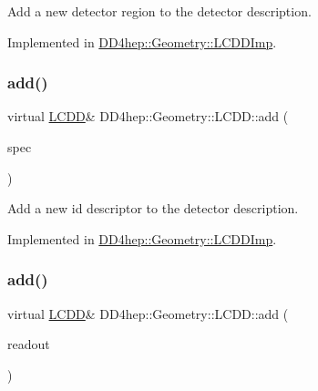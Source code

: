 Add a new detector region to the detector description. 



Implemented in \hyperlink{class_d_d4hep_1_1_geometry_1_1_l_c_d_d_imp_ab8c4f8e119f235e5f050349b19892d47}{D\+D4hep\+::\+Geometry\+::\+L\+C\+D\+D\+Imp}.

\hypertarget{class_d_d4hep_1_1_geometry_1_1_l_c_d_d_a346e521d7e74531597650fa812394e89}{}\label{class_d_d4hep_1_1_geometry_1_1_l_c_d_d_a346e521d7e74531597650fa812394e89} 
\subsubsection{\texorpdfstring{add()}{add()}\hspace{0.1cm}{\footnotesize\ttfamily [5/10]}}
{\footnotesize\ttfamily virtual \hyperlink{class_d_d4hep_1_1_geometry_1_1_l_c_d_d}{L\+C\+DD}\& D\+D4hep\+::\+Geometry\+::\+L\+C\+D\+D\+::add (\begin{DoxyParamCaption}\item[{\hyperlink{class_d_d4hep_1_1_geometry_1_1_i_d_descriptor}{I\+D\+Descriptor}}]{spec }\end{DoxyParamCaption})\hspace{0.3cm}{\ttfamily [pure virtual]}}



Add a new id descriptor to the detector description. 



Implemented in \hyperlink{class_d_d4hep_1_1_geometry_1_1_l_c_d_d_imp_ae03550f5bda6285d2bbf3dfa53919791}{D\+D4hep\+::\+Geometry\+::\+L\+C\+D\+D\+Imp}.

\hypertarget{class_d_d4hep_1_1_geometry_1_1_l_c_d_d_a68f3490691ccf2937987fbb60969a70d}{}\label{class_d_d4hep_1_1_geometry_1_1_l_c_d_d_a68f3490691ccf2937987fbb60969a70d} 
\subsubsection{\texorpdfstring{add()}{add()}\hspace{0.1cm}{\footnotesize\ttfamily [6/10]}}
{\footnotesize\ttfamily virtual \hyperlink{class_d_d4hep_1_1_geometry_1_1_l_c_d_d}{L\+C\+DD}\& D\+D4hep\+::\+Geometry\+::\+L\+C\+D\+D\+::add (\begin{DoxyParamCaption}\item[{\hyperlink{class_d_d4hep_1_1_geometry_1_1_readout}{Readout}}]{readout }\end{DoxyParamCaption})\hspace{0.3cm}{\ttfamily [pure virtual]}}



